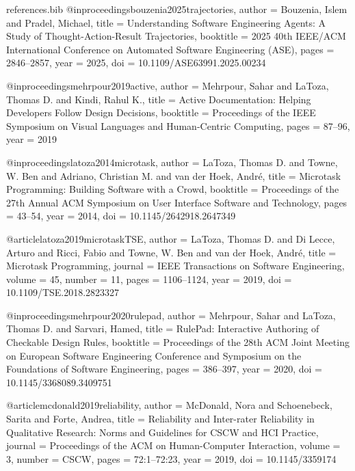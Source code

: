 \begin{filecontents*}[overwrite]{references.bib}
@inproceedings{bouzenia2025trajectories,
  author    = {Bouzenia, Islem and Pradel, Michael},
  title     = {Understanding Software Engineering Agents: A Study of
               Thought-Action-Result Trajectories},
  booktitle = {2025 40th IEEE/ACM International Conference on Automated
               Software Engineering (ASE)},
  pages     = {2846--2857},
  year      = {2025},
  doi       = {10.1109/ASE63991.2025.00234}
}

@inproceedings{mehrpour2019active,
  author    = {Mehrpour, Sahar and LaToza, Thomas D. and Kindi, Rahul K.},
  title     = {Active Documentation: Helping Developers Follow Design Decisions},
  booktitle = {Proceedings of the IEEE Symposium on Visual Languages and Human-Centric Computing},
  pages     = {87--96},
  year      = {2019}
}

@inproceedings{latoza2014microtask,
  author    = {LaToza, Thomas D. and Towne, W. Ben and Adriano, Christian M. and van der Hoek, Andr{\'e}},
  title     = {Microtask Programming: Building Software with a Crowd},
  booktitle = {Proceedings of the 27th Annual ACM Symposium on User Interface Software and Technology},
  pages     = {43--54},
  year      = {2014},
  doi       = {10.1145/2642918.2647349}
}

@article{latoza2019microtaskTSE,
  author  = {LaToza, Thomas D. and Di Lecce, Arturo and Ricci, Fabio and Towne, W. Ben and van der Hoek, Andr{\'e}},
  title   = {Microtask Programming},
  journal = {IEEE Transactions on Software Engineering},
  volume  = {45},
  number  = {11},
  pages   = {1106--1124},
  year    = {2019},
  doi     = {10.1109/TSE.2018.2823327}
}

@inproceedings{mehrpour2020rulepad,
  author    = {Mehrpour, Sahar and LaToza, Thomas D. and Sarvari, Hamed},
  title     = {RulePad: Interactive Authoring of Checkable Design Rules},
  booktitle = {Proceedings of the 28th ACM Joint Meeting on European Software Engineering Conference and Symposium on the Foundations of Software Engineering},
  pages     = {386--397},
  year      = {2020},
  doi       = {10.1145/3368089.3409751}
}

@article{mcdonald2019reliability,
  author  = {McDonald, Nora and Schoenebeck, Sarita and Forte, Andrea},
  title   = {Reliability and Inter-rater Reliability in Qualitative Research: Norms and Guidelines for {CSCW} and {HCI} Practice},
  journal = {Proceedings of the ACM on Human-Computer Interaction},
  volume  = {3},
  number  = {CSCW},
  pages   = {72:1--72:23},
  year    = {2019},
  doi     = {10.1145/3359174}
}



\end{filecontents*}
